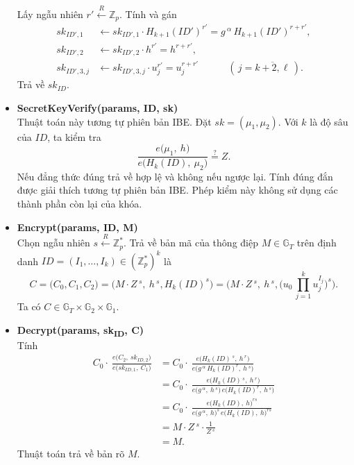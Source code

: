 \documentclass[class=report, crop=false]{standalone}
\begin{document}
\begin{itemize}[leftmargin=1cm, itemindent=-1cm]
			Lấy ngẫu nhiên $r' \xleftarrow{R} \mathbb{Z}_p$. Tính và gán
			\begin{align*}
				sk_{ID', 1} &\leftarrow
					sk_{ID', 1} \cdot H_{k + 1}(ID')^{r'} =
					g\,^\alpha\, H_{k + 1}(ID')^{r + r'}, \\
				sk_{ID', 2} &\leftarrow sk_{ID', 2} \cdot h^{r'} = h^{r + r'}, \\
				sk_{ID', 3, j} &\leftarrow sk_{ID', 3, j} \cdot u_j^{r'} = u_j^{r + r'} \quad\quad\quad (\, j = \overline{k + 2, \ell}\,).
			\end{align*}
			Trả về $sk_{ID}$.
			\item[] {\sffamily\bfseries SecretKeyVerify(params, ID, sk)} \\
			Thuật toán này tương tự phiên bản IBE. Đặt $sk = (\mu_1, \mu_2)$. Với $k$ là độ sâu của $ID$, ta kiểm tra
			\[
				\frac{e \Big(\mu_1,\ h \Big)}{e \Big(H_{k}(ID),\ \mu_2 \Big)} \overset{?}{=} Z.
			\]
			Nếu đẳng thức đúng trả về hợp lệ và không nếu ngược lại. Tính đúng đắn được giải thích tương tự phiên bản IBE. Phép kiểm này không sử dụng các thành phần còn lại của khóa.
			\item[] {\sffamily\bfseries Encrypt(params, ID, M)} \\
			Chọn ngẫu nhiên $s \xleftarrow{R} \mathbb{Z}_p^*$. Trả về bản mã của thông điệp $M \in \mathbb{G}_T$ trên định danh $ID = (I_1, \dots, I_k) \in (\mathbb{Z}_p^*)^k$ là
			\[
				C = \Big(C_0, C_1, C_2 \Big) = \Big(M \cdot Z\,^s,\ h\,^s, H_{k}(ID)^s \Big) = \Big(M \cdot Z\,^s,\ h\,^s, \Big(u_0 \, \prod_{j = 1}^k u_j^{I_j} \Big)^s \Big).
			\]
			Ta có $C \in \mathbb{G}_T \times \mathbb{G}_2 \times \mathbb{G}_1$.
			\item[] {\sffamily\bfseries Decrypt(params, sk\textsubscript{ID}, C)} \\
			Tính
			\begin{align*}
				C_0 \cdot\ \frac{e \Big(C_2,\ sk_{ID, 2} \Big)}{e \Big(sk_{ID, 1},\ C_1 \Big)} &=
				C_0 \cdot\ \frac{e \Big(H_{k}(ID)\,^s,\ h\,^r \Big)}{e \Big(g\,^\alpha\, H_{k}(ID)^r,\ h\,^s \Big)} \\ &=
				C_0 \cdot\ \frac{e \Big(H_{k}(ID)\,^s,\ h\,^r \Big)}{e \Big(g\,^\alpha,\ h\,^s \Big)\, e \Big(H_{k}(ID)^r,\ h\,^s \Big)} \\ &=
				C_0 \cdot\ \frac{e \Big(H_{k}(ID),\ h \Big)^{rs}}{e \Big(g\,^\alpha,\ h \Big)^s\, e \Big(H_{k}(ID),\ h \Big)^{rs}} \\ &=
				M \cdot Z\,^s \cdot \frac{1}{Z\,^s} \\
				&= M.
			\end{align*}
			Thuật toán trả về bản rõ $M$.
		\end{itemize}
\end{document}
